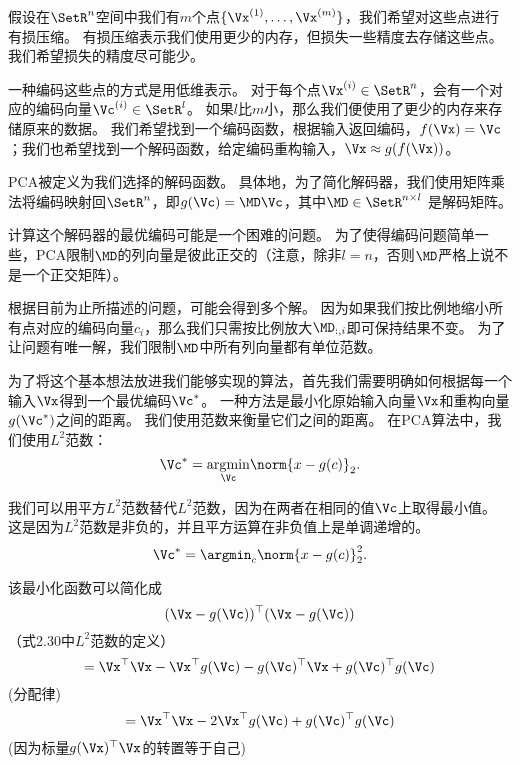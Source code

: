 假设在$\SetR^n$空间中我们有$m$个点$\{\Vx^{(1)}, \dots ,\Vx^{(m)}\}$，我们希望对这些点进行有损压缩。
有损压缩表示我们使用更少的内存，但损失一些精度去存储这些点。
我们希望损失的精度尽可能少。


一种编码这些点的方式是用低维表示。
对于每个点$\Vx^{(i)} \in \SetR^n$，会有一个对应的编码向量$\Vc^{(i)}\in \SetR^l$。
如果$l$比$m$小，那么我们便使用了更少的内存来存储原来的数据。
我们希望找到一个编码函数，根据输入返回编码，$f(\Vx)=\Vc$；我们也希望找到一个解码函数，给定编码重构输入，$\Vx\approx g(f(\Vx))$。


\gls{PCA}被定义为我们选择的解码函数。
具体地，为了简化解码器，我们使用矩阵乘法将编码映射回$\SetR^n$，即$g(\Vc)=\MD\Vc$，其中$\MD\in \SetR^{n\times l}$ 是解码矩阵。



计算这个解码器的最优编码可能是一个困难的问题。
为了使得编码问题简单一些，PCA限制$\MD$的列向量是彼此正交的（注意，除非$l=n$，否则$\MD$严格上说不是一个正交矩阵）。


根据目前为止所描述的问题，可能会得到多个解。
因为如果我们按比例地缩小所有点对应的编码向量$c_i$，那么我们只需按比例放大$\MD_{:,i}$即可保持结果不变。
为了让问题有唯一解，我们限制$\MD$中所有列向量都有单位范数。


为了将这个基本想法放进我们能够实现的算法，首先我们需要明确如何根据每一个输入$\Vx$得到一个最优编码$\Vc^*$。
一种方法是最小化原始输入向量$\Vx$和重构向量$g(\Vc^*)$之间的距离。
我们使用范数来衡量它们之间的距离。
在PCA算法中，我们使用$L^2$范数：
\begin{equation}
\Vc^* = \underset{\Vc}{\arg\!\min} \norm{x-g(c)}_2.
\end{equation}


我们可以用平方$L^2$范数替代$L^2$范数，因为在两者在相同的值$\Vc$上取得最小值。
这是因为$L^2$范数是非负的，并且平方运算在非负值上是单调递增的。
\begin{equation}
\Vc^* = \argmin_c \norm{x - g(c)}_2^2.
\end{equation}


该最小化函数可以简化成
\begin{equation}
(\Vx-g(\Vc))^\top(\Vx-g(\Vc))
\end{equation}
（式2.30中$L^2$范数的定义）
\begin{equation}
    = \Vx^\top\Vx - \Vx^\top g(\Vc) - g(\Vc)^\top\Vx + g(\Vc)^\top g(\Vc)
\end{equation}
(分配律)
\begin{equation}
    = \Vx^\top \Vx - 2\Vx^\top g(\Vc) + g(\Vc)^\top g(\Vc)
\end{equation}
(因为标量$g(\Vx)^\top\Vx$的转置等于自己)


